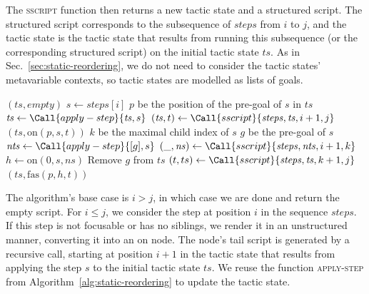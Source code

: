 \documentclass[sigplan,screen]{acmart}
\begin{document}
The \textsc{sscript} function then returns a new tactic state and a structured script.
The structured script corresponds to the subsequence of $\mathit{steps}$ from $i$ to $j$, and the tactic state is the tactic state that results from running this subsequence (or the corresponding structured script) on the initial tactic state $\mathit{ts}$.
As in Sec.~\ref{sec:static-reordering}, we do not need to consider the tactic states' metavariable contexts, so tactic states are modelled as lists of goals.

\begin{algorithm}
  \begin{algorithmic}
        \State \Return $(\mathit{ts}, \mathit{empty})$
      \EndIf
      \State $s \gets \mathit{steps}[i]$
      \State \Let $p$ be the position of the pre-goal of $s$ in $\mathit{ts}$
        \State $\mathit{ts} \gets \Call{apply-step}{\mathit{ts}, s}$
        \State $(\mathit{ts}, t) \gets \Call{sscript}{\mathit{steps}, \mathit{ts}, i+1, j}$
        \State \Return $(\mathit{ts}, \mathrm{on}(p, s, t))$
      \Else
        \State \Let $k$ be the maximal child index of $s$
        \State \Let $g$ be the pre-goal of $s$
        \State $\mathit{nts} \gets \Call{apply-step}{[g], s}$
        \State $(\_, \mathit{ns}) \gets \Call{sscript}{\mathit{steps}, \mathit{nts}, i+1, k}$
        \State $h \gets \mathrm{on}(0, s, \mathit{ns})$
        \State Remove $g$ from $ts$
        \State $(t, ts) \gets \Call{sscript}{\mathit{steps}, \mathit{ts}, k+1, j}$
        \State \Return $(\mathit{ts}, \mathrm{fas}(p, h, t))$
      \EndIf
    \EndFunction
  \end{algorithmic}
  \caption{Conversion of a sequence of steps to a structured script}%
  \label{alg:sscript}
\end{algorithm}

The algorithm's base case is $i > j$, in which case we are done and return the empty script.
For $i ≤ j$, we consider the step at position $i$ in the sequence $\mathit{steps}$.
If this step is not focusable or has no siblings, we render it in an unstructured manner, converting it into an $\mathrm{on}$ node.
The node's tail script is generated by a recursive call, starting at position $i + 1$ in the tactic state that results from applying the step $s$ to the initial tactic state $\mathit{ts}$.
We reuse the function \textsc{apply-step} from Algorithm~\ref{alg:static-reordering} to update the tactic state.
\end{document}
